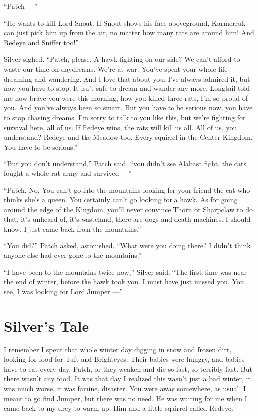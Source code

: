 \documentclass[ebook,oneside,openany,17pt]{memoir}
\renewcommand{\thechapter}{\Roman{chapter}}
\newcounter{sections}
\newcommand{\sections}[1]{%
  \section*{#1}
  \addtocounter{sections}{1}%
  \pdfbookmark[1]{#1}{section.\thechapter.\thesections}}
\begin{document}
“Patch —”

“He wants to kill Lord Snout. If Snout shows his face aboveground,
Karmerruk can just pick him up from the air, no matter how many rats
are around him! And Redeye and Sniffer too!”

Silver sighed. “Patch, please. A hawk fighting on our side? We can’t
afford to waste our time on daydreams. We’re at war. You’ve spent your
whole life dreaming and wandering. And I love that about you, I’ve
always admired it, but now you have to stop. It isn’t safe to dream
and wander any more. Longtail told me how brave you were this morning,
how you killed three rats, I’m so proud of you. And you’ve always been
so smart. But you have to be serious now, you have to stop chasing
dreams. I’m sorry to talk to you like this, but we’re fighting for
survival here, all of us. If Redeye wins, the rats will kill us
all. All of us, you understand? Redeye and the Meadow too. Every
squirrel in the Center Kingdom. You have to be serious.”

“But you don’t understand,” Patch said, “you didn’t see Alabast fight,
the cats fought a whole rat army and survived —”

“Patch. No. You can’t go into the mountains looking for your friend
the cat who thinks she’s a queen. You certainly can’t go looking for a
hawk. As for going around the edge of the Kingdom, you’ll never
convince Thorn or Sharpclaw to do that, it’s unheard of, it’s
wasteland, there are dogs and death machines. I should know. I just
came back from the mountains.”

“You did?” Patch asked, astonished. “What were you doing there? I
didn’t think anyone else had ever gone to the mountains.”

“I have been to the mountains twice now,” Silver said. “The first time
was near the end of winter, before the hawk took you. I must have just
missed you. You see, I was looking for Lord Jumper —”


\sections{Silver’s Tale}

I remember I spent that whole winter day digging in snow and frozen
dirt, looking for food for Tuft and Brighteyes. Their babies were
hungry, and babies have to eat every day, Patch, or they weaken and
die so fast, so terribly fast. But there wasn’t any food. It was that
day I realized this wasn’t just a bad winter, it was much worse, it
was famine, disaster. You were away somewhere, as usual. I meant to go
find Jumper, but there was no need. He was waiting for me when I came
back to my drey to warm up. Him and a little squirrel called Redeye.
\end{document}
